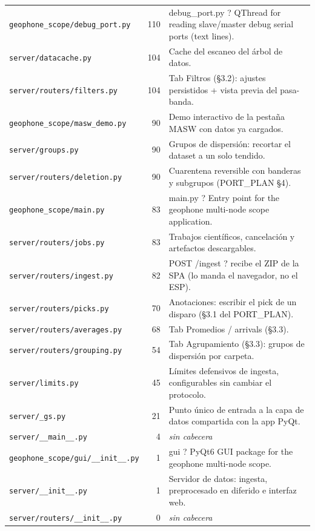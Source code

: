 \begin{longtable}{@{}p{5.4cm} r p{8.6cm}@{}}
\texttt{\scriptsize geophone\_scope/debug\_port.py} & 110 & debug\_port.py ? QThread for reading slave/master debug serial ports (text lines). \\
\texttt{\scriptsize server/datacache.py} & 104 & Cache del escaneo del árbol de datos. \\
\texttt{\scriptsize server/routers/filters.py} & 104 & Tab Filtros (§3.2): ajustes persistidos + vista previa del pasa-banda. \\
\texttt{\scriptsize geophone\_scope/masw\_demo.py} & 90 & Demo interactivo de la pestaña MASW con datos ya cargados. \\
\texttt{\scriptsize server/groups.py} & 90 & Grupos de dispersión: recortar el dataset a un solo tendido. \\
\texttt{\scriptsize server/routers/deletion.py} & 90 & Cuarentena reversible con banderas y subgrupos (PORT\_PLAN §4). \\
\texttt{\scriptsize geophone\_scope/main.py} & 83 & main.py ? Entry point for the geophone multi-node scope application. \\
\texttt{\scriptsize server/routers/jobs.py} & 83 & Trabajos científicos, cancelación y artefactos descargables. \\
\texttt{\scriptsize server/routers/ingest.py} & 82 & POST /ingest ? recibe el ZIP de la SPA (lo manda el navegador, no el ESP). \\
\texttt{\scriptsize server/routers/picks.py} & 70 & Anotaciones: escribir el pick de un disparo (§3.1 del PORT\_PLAN). \\
\texttt{\scriptsize server/routers/averages.py} & 68 & Tab Promedios / arrivals (§3.3). \\
\texttt{\scriptsize server/routers/grouping.py} & 54 & Tab Agrupamiento (§3.3): grupos de dispersión por carpeta. \\
\texttt{\scriptsize server/limits.py} & 45 & Límites defensivos de ingesta, configurables sin cambiar el protocolo. \\
\texttt{\scriptsize server/\_gs.py} & 21 & Punto único de entrada a la capa de datos compartida con la app PyQt. \\
\texttt{\scriptsize server/\_\_main\_\_.py} & 4 & \textit{sin cabecera} \\
\texttt{\scriptsize geophone\_scope/gui/\_\_init\_\_.py} & 1 & gui ? PyQt6 GUI package for the geophone multi-node scope. \\
\texttt{\scriptsize server/\_\_init\_\_.py} & 1 & Servidor de datos: ingesta, preprocesado en diferido e interfaz web. \\
\texttt{\scriptsize server/routers/\_\_init\_\_.py} & 0 & \textit{sin cabecera} \\
\end{longtable}
\normalsize

